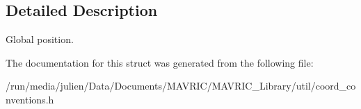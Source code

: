 \subsection{Detailed Description}
Global position. 

The documentation for this struct was generated from the following file\+:\begin{DoxyCompactItemize}
\item 
/run/media/julien/\+Data/\+Documents/\+M\+A\+V\+R\+I\+C/\+M\+A\+V\+R\+I\+C\+\_\+\+Library/util/coord\+\_\+conventions.\+h\end{DoxyCompactItemize}
